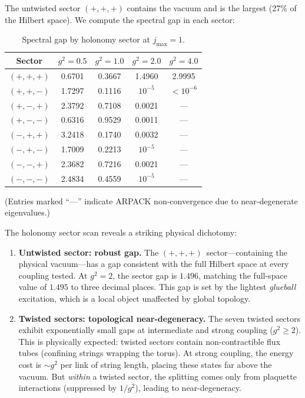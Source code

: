 \documentclass[12pt,a4paper]{article}
\begin{document}
The untwisted sector $(+,+,+)$ contains the vacuum and is the largest (27\% of the Hilbert space). We compute the spectral gap in each sector:

\begin{table}[h]
\centering
\caption{Spectral gap by holonomy sector at $j_{\max}=1$.}
\label{tab:su2twist}
\begin{tabular}{@{}ccccc@{}}
\toprule
Sector & $g^2=0.5$ & $g^2=1.0$ & $g^2=2.0$ & $g^2=4.0$ \\
\midrule
$(+,+,+)$ & 0.6701 & 0.3667 & 1.4960 & 2.9995 \\
$(+,+,-)$ & 1.7297 & 0.1116 & $10^{-5}$ & $<10^{-6}$ \\
$(+,-,+)$ & 2.3792 & 0.7108 & 0.0021 & --- \\
$(+,-,-)$ & 0.6316 & 0.9529 & 0.0011 & --- \\
$(-,+,+)$ & 3.2418 & 0.1740 & 0.0032 & --- \\
$(-,+,-)$ & 1.7009 & 0.2213 & $10^{-5}$ & --- \\
$(-,-,+)$ & 2.3682 & 0.7216 & 0.0021 & --- \\
$(-,-,-)$ & 2.4834 & 0.4559 & $10^{-5}$ & --- \\
\bottomrule
\end{tabular}
\end{table}

\noindent (Entries marked ``---'' indicate ARPACK non-convergence due to near-degenerate eigenvalues.)

\medskip

The holonomy sector scan reveals a striking physical dichotomy:

\begin{enumerate}[label=(\roman*)]
\item \textbf{Untwisted sector: robust gap.} The $(+,+,+)$~sector---containing the physical vacuum---has a gap consistent with the full Hilbert space at every coupling tested. At $g^2=2$, the sector gap is $1.496$, matching the full-space value of $1.495$ to three decimal places. This gap is set by the lightest \emph{glueball} excitation, which is a local object unaffected by global topology.

\item \textbf{Twisted sectors: topological near-degeneracy.} The seven twisted sectors exhibit exponentially small gaps at intermediate and strong coupling ($g^2\ge 2$). This is physically expected: twisted sectors contain non-contractible flux tubes (confining strings wrapping the torus). At strong coupling, the energy cost is $\sim g^2$ per link of string length, placing these states far above the vacuum. But \emph{within} a twisted sector, the splitting comes only from plaquette interactions (suppressed by $1/g^2$), leading to near-degeneracy.
\end{enumerate}
\end{document}
